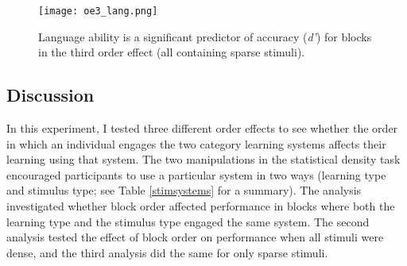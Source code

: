 \documentclass[../dissertation.tex]{subfiles}
\begin{document}
\begin{figure}[H]
\vspace{-10pt}
\texttt{[image: oe3\_lang.png]}
\caption[Relationship between language ability and accuracy for the third order effect]{Language ability is a significant predictor of accuracy (\textit{d'}) for blocks in the third order effect (all containing sparse stimuli). }
\label{oe3_lang}
\vspace{-10pt}
\end{figure}	
	
\subsection{Discussion}

	In this experiment, I tested three different order effects to see whether the order in which an individual engages the two category learning systems affects their learning using that system. The two manipulations in the statistical density task encouraged participants to use a particular system in two ways (learning type and stimulus type; see Table \ref{stimsystems} for a summary). The analysis investigated whether block order affected performance in blocks where both the learning type and the stimulus type engaged the same system. The second analysis tested the effect of block order on performance when all stimuli were dense, and the third analysis did the same for only sparse stimuli. \par
	
\end{document}
